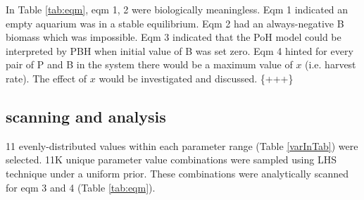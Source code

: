 \documentclass[../thesis.tex]{subfiles} %
\begin{document}
In Table \ref{tab:eqm}, eqm 1, 2 were biologically meaningless. Eqm 1 indicated an empty aquarium was in a stable equilibrium.  Eqm 2 had an always-negative B biomass which was impossible.  Eqm 3 indicated that the PoH model could be interpreted by PBH when initial value of B was set zero.  Eqm 4 hinted for every pair of P and B in the system there would be a maximum value of $x$ (i.e. harvest rate).  The effect of $x$ would be investigated and discussed.  \{+++\}

\subsection{scanning and analysis}
11 evenly-distributed values within each parameter range (Table \ref{varInTab}) were selected.  11K unique parameter value combinations were sampled using LHS technique under a uniform prior.  These combinations were analytically scanned for eqm 3 and 4 (Table \ref{tab:eqm}).
\end{document}
